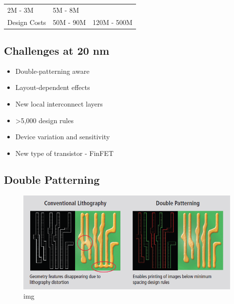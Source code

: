 \documentclass[
]{article}
\begin{document}
\begin{longtable}[]{@{}lll@{}}
\begin{minipage}[t]{0.26\columnwidth}
2M - 3M\strut
\end{minipage} & \begin{minipage}[t]{0.31\columnwidth}\raggedright
5M - 8M\strut
\end{minipage}\tabularnewline
\begin{minipage}[t]{0.34\columnwidth}\raggedright
Design Costs\strut
\end{minipage} & \begin{minipage}[t]{0.26\columnwidth}\raggedright
50M - 90M\strut
\end{minipage} & \begin{minipage}[t]{0.31\columnwidth}\raggedright
120M - 500M\strut
\end{minipage}\tabularnewline
\bottomrule
\end{longtable}

\hypertarget{challenges-at-20-nm}{%
\subsection{Challenges at 20 nm}\label{challenges-at-20-nm}}

\begin{itemize}
\item
  Double-patterning aware
\item
  Layout-dependent effects
\item
  New local interconnect layers
\item
  \textgreater5,000 design rules
\item
  Device variation and sensitivity
\item
  New type of transistor - FinFET
\end{itemize}

\hypertarget{double-patterning}{%
\subsection{Double Patterning}\label{double-patterning}}

\begin{figure}
\centering
\includegraphics{lec04.files/img001.png}
\caption{img}
\end{figure}
\end{document}
